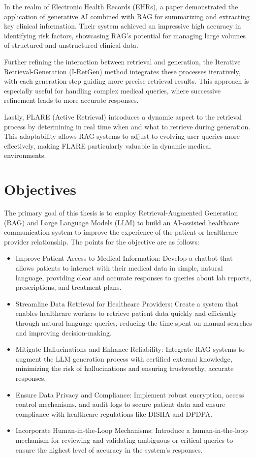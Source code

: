 In the realm of Electronic Health Records (EHRs), a paper demonstrated the application of generative AI combined with RAG for summarizing and extracting key clinical information\cite{paper2}. Their system achieved an impressive high accuracy in identifying risk factors, showcasing RAG's potential for managing large volumes of structured and unstructured clinical data.

Further refining the interaction between retrieval and generation, the Iterative Retrieval-Generation (I-RetGen)\cite{10.1007/978-3-031-66538-7_22} method integrates these processes iteratively, with each generation step guiding more precise retrieval results. This approach is especially useful for handling complex medical queries, where successive refinement leads to more accurate responses.

Lastly, FLARE (Active Retrieval)\cite{10.1007/978-3-031-66538-7_22} introduces a dynamic aspect to the retrieval process by determining in real time when and what to retrieve during generation. This adaptability allows RAG systems to adjust to evolving user queries more effectively, making FLARE particularly valuable in dynamic medical environments.

\newpage

\section{Objectives}
The primary goal of this thesis is to employ Retrieval-Augmented Generation (RAG) and Large Language Models (LLM) to build an AI-assisted healthcare communication system to improve the experience of the patient or healthcare provider relationship. The points for the objective are as follows:

\begin{itemize}
    \item Improve Patient Access to Medical Information: Develop a chatbot that allows patients to interact with their medical data in simple, natural language, providing clear and accurate responses to queries about lab reports, prescriptions, and treatment plans.
    \item Streamline Data Retrieval for Healthcare Providers: Create a system that enables healthcare workers to retrieve patient data quickly and efficiently through natural language queries, reducing the time spent on manual searches and improving decision-making.
    \item Mitigate Hallucinations and Enhance Reliability: Integrate RAG systems to augment the LLM generation process with certified external knowledge, minimizing the risk of hallucinations and ensuring trustworthy, accurate responses.
    \item Ensure Data Privacy and Compliance: Implement robust encryption, access control mechanisms, and audit logs to secure patient data and ensure compliance with healthcare regulations like DISHA\cite{Ganapathy} and DPDPA\@\cite{SundaraNarendran+2023+129+141}.
    \item Incorporate Human-in-the-Loop Mechanisms: Introduce a human-in-the-loop mechanism for reviewing and validating ambiguous or critical queries to ensure the highest level of accuracy in the system's responses.
\end{itemize}